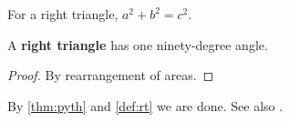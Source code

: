 \begin{theorem}[Pythagoras]\label{thm:pyth}
For a right triangle, $a^2 + b^2 = c^2$.
\end{theorem}

\begin{definition}\label{def:rt}
A \textbf{right triangle} has one ninety-degree angle.
\end{definition}

\begin{proof}
By rearrangement of areas.
\end{proof}

By \cref{thm:pyth} and \cref{def:rt} we are done. See also .

